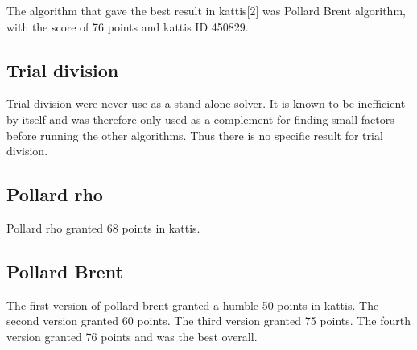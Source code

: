 The algorithm that gave the best result in kattis[2] was Pollard Brent algorithm, with the score of 76 points and kattis ID 450829.

\subsection{Trial division}

Trial division were never use as a stand alone solver. It is known to be inefficient by itself and was therefore only used as a complement for finding small factors before running the other algorithms. Thus there is no specific result for trial division.

\subsection{Pollard rho}

Pollard rho granted 68 points in kattis.

\subsection{Pollard Brent}

The first version of pollard brent granted a humble 50 points in kattis. The second version granted 60 points. The third version granted 75 points. The fourth version granted 76 points and was the best overall.

